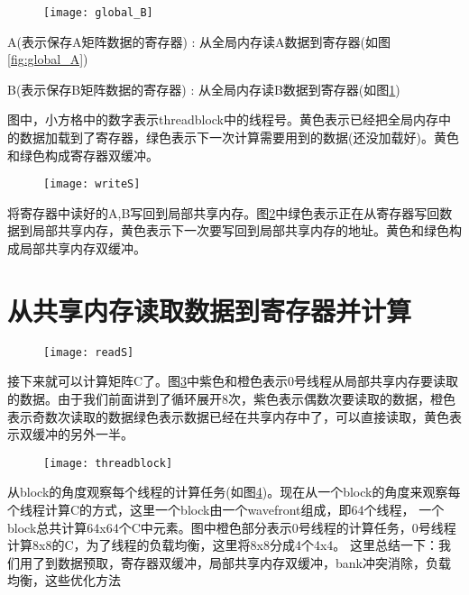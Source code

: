 \begin{figure}[htbp]
	\centering
	\texttt{[image: global\_B]}
	\label{fig:global_B}
\end{figure}

A(表示保存A矩阵数据的寄存器) : 从全局内存读A数据到寄存器(如图\ref{fig:global_A})

B(表示保存B矩阵数据的寄存器) : 从全局内存读B数据到寄存器(如图\ref{fig:global_B})

图中，小方格中的数字表示threadblock中的线程号。黄色表示已经把全局内存中的数据加载到了寄存器，绿色表示下一次计算需要用到的数据(还没加载好)。黄色和绿色构成寄存器双缓冲。

\begin{figure}[htbp]
	\centering
	\texttt{[image: writeS]}
	\label{fig:writeS}
\end{figure}

将寄存器中读好的A,B写回到局部共享内存。图\ref{fig:writeS}中绿色表示正在从寄存器写回数据到局部共享内存，黄色表示下一次要写回到局部共享内存的地址。黄色和绿色构成局部共享内存双缓冲。


\section{从共享内存读取数据到寄存器并计算}
\begin{figure}[htbp]
	\centering
	\texttt{[image: readS]}
	\label{fig:readS}
\end{figure}

接下来就可以计算矩阵C了。图\ref{fig:readS}中紫色和橙色表示0号线程从局部共享内存要读取的数据。由于我们前面讲到了循环展开8次，紫色表示偶数次要读取的数据，橙色表示奇数次读取的数据绿色表示数据已经在共享内存中了，可以直接读取，黄色表示双缓冲的另外一半。

\begin{figure}[htbp]
	\centering
	\texttt{[image: threadblock]}
	\label{fig:threadblock}
\end{figure}

从block的角度观察每个线程的计算任务(如图\ref{fig:threadblock})。现在从一个block的角度来观察每个线程计算C的方式，这里一个block由一个wavefront组成，即64个线程， 一个block总共计算64x64个C中元素。图中橙色部分表示0号线程的计算任务，0号线程计算8x8的C，为了线程的负载均衡，这里将8x8分成4个4x4。
这里总结一下：我们用了到数据预取，寄存器双缓冲，局部共享内存双缓冲，bank冲突消除，负载均衡，这些优化方法


